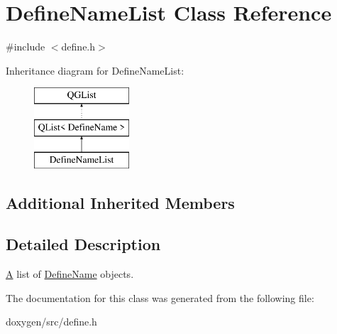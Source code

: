 \hypertarget{class_define_name_list}{}\section{Define\+Name\+List Class Reference}
\label{class_define_name_list}


{\ttfamily \#include $<$define.\+h$>$}

Inheritance diagram for Define\+Name\+List\+:\begin{figure}[H]
\begin{center}
\leavevmode
\includegraphics[height=3.000000cm]{class_define_name_list}
\end{center}
\end{figure}
\subsection*{Additional Inherited Members}


\subsection{Detailed Description}
\mbox{\hyperlink{class_a}{A}} list of \mbox{\hyperlink{class_define_name}{Define\+Name}} objects. 

The documentation for this class was generated from the following file\+:\begin{DoxyCompactItemize}
\item 
doxygen/src/define.\+h\end{DoxyCompactItemize}
